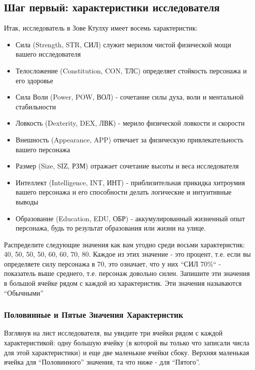 \documentclass[letterpaper,twocolumn,openany, twoside, 8pt, usenames]{cocbook}
\begin{document}
\subsection*{Шаг первый: характеристики исследователя}
Итак, исследователь в Зове Ктулху имеет восемь характеристик:

\begin{itemize}[leftmargin=4mm]
  \item Сила (Strength, STR, СИЛ) служит мерилом чистой физической мощи вашего исследователя
  \item Телосложение (Constitution, CON, ТЛС) определяет стойкость персонажа и его здоровье
  \item Сила Воли (Power, POW, ВОЛ) - сочетание силы духа, воли и ментальной стабильности
  \item Ловкость (Dexterity, DEX, ЛВК) - мерило физической ловкости и скорости
  \item Внешность (Appearance, APP) отвечает за физическую привлекательность вашего персонажа
  \item Размер (Size, SIZ, РЗМ) отражает сочетание высоты и веса исследователя
  \item Интеллект (Intelligence, INT, ИНТ) - приблизительная прикидка хитроумия вашего персонажа и его способности делать логические и интуитивные выводы
  \item Образование (Education, EDU, ОБР) - аккумулированный жизненный опыт персонажа, будь то результат образования или жизни на улице.
\end{itemize}

Распределите следующие значения как вам угодно среди восьми характеристик: 40, 50, 50, 50, 60, 60, 70, 80. Каждое из этих значение - это процент, т.е. если вы определяете силу персонажа в 70, это означает, что у них ``СИЛ 70\%`` - показатель выше среднего, т.е. персонаж довольно силен. Запишите эти значения в большой ячейке рядом с каждой из характеристик. Эти значения называются ``Обычными''

\subsubsection*{\nohyphens{Половинные и Пятые Значения Характеристик}}

Взглянув на лист исследователя, вы увидите три ячейки рядом с каждой характеристикой: одну большую ячейку (в которой вы только что записали числа для этой характеристики) и еще две маленькие ячейки сбоку. Верхняя маленькая ячейка для ``Половинного'' значения, та что ниже - для ``Пятого''.
\end{document}
